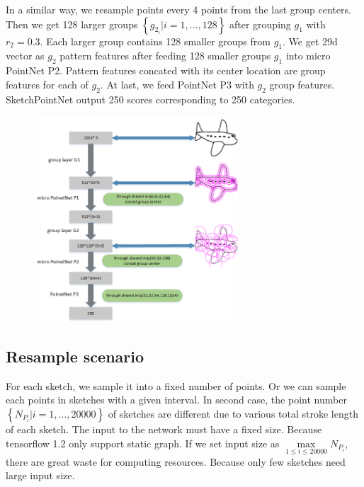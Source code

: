 In a similar way, we resample points every 4 points from the last group centers. Then we get 128 larger groups $\left\{ g_{2_i}| i = 1, ..., 128 \right\}$ after grouping $g_1$ with $r_2 = 0.3$. Each larger group contains 128 smaller groups from $g_1$. We get 29d vector as $g_2$ pattern features after feeding 128 smaller groups $g_1$ into micro PointNet P2. Pattern features concated with its center location are group features for each of $g_2$. At last, we feed PointNet P3 with $g_2$ group features. SketchPointNet output 250 scores corresponding to 250 categories.

\begin{figure}
    \center
    \includegraphics[width=3in]{images/sketchpointnet.png}
    \label{fig:sketchpointnet}
\end{figure}


\subsection{Resample scenario}
\label{ssec:resample_scenario}

For each sketch, we sample it into a fixed number of points. Or we can sample each points in sketches with a given interval. In second case, the point number $\left\{ N_{P_i}| i = 1, ..., 20000 \right\}$ of sketches are different due to various total stroke length of each sketch. The input to the network must have a fixed size. Because tensorflow 1.2 only support static graph. If we set input size as $\max \limits_{1 \le i \le 20000} N_{P_i}$, there are great waste for computing resources. Because only few sketches need large input size.

